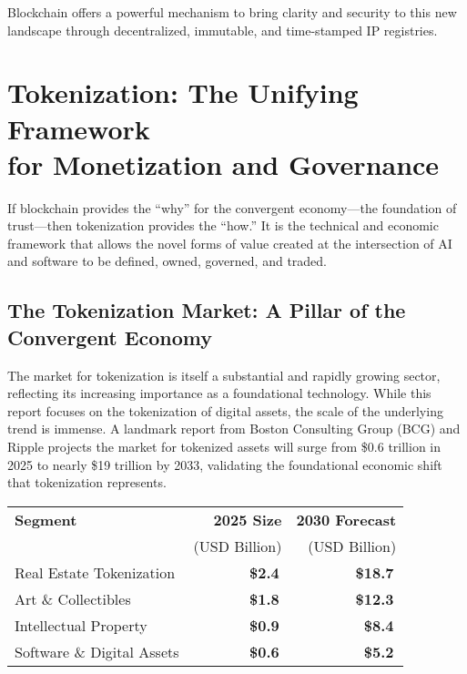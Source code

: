 \documentclass[11pt,a4paper]{report}
\newcommand{\marketvalue}[2]{\textcolor{trust}{\textbf{\$#1}}\,\textcolor{darkgray}{#2}}
\begin{document}
Blockchain offers a powerful mechanism to bring clarity and security to this new landscape through decentralized, immutable, and time-stamped IP registries.

\chapter{Tokenization: The Unifying Framework\\for Monetization and Governance}

If blockchain provides the ``why'' for the convergent economy---the foundation of trust---then tokenization provides the ``how.'' It is the technical and economic framework that allows the novel forms of value created at the intersection of AI and software to be defined, owned, governed, and traded.

\section{The Tokenization Market: A Pillar of the Convergent Economy}

The market for tokenization is itself a substantial and rapidly growing sector, reflecting its increasing importance as a foundational technology. While this report focuses on the tokenization of digital assets, the scale of the underlying trend is immense. A landmark report from Boston Consulting Group (BCG) and Ripple projects the market for tokenized assets will surge from \$0.6 trillion in 2025 to nearly \$19 trillion by 2033, validating the foundational economic shift that tokenization represents.

\begin{marketfigure}
\centering
\begin{tabular}{lrr}
\toprule
\textbf{Segment} & \textbf{2025 Size} & \textbf{2030 Forecast} \\
& (USD Billion) & (USD Billion) \\
\midrule
Real Estate Tokenization & \marketvalue{2.4}{} & \marketvalue{18.7}{} \\
Art \& Collectibles & \marketvalue{1.8}{} & \marketvalue{12.3}{} \\
Intellectual Property & \marketvalue{0.9}{} & \marketvalue{8.4}{} \\
Software \& Digital Assets & \marketvalue{0.6}{} & \marketvalue{5.2}{} \\
\bottomrule
\end{tabular}
\end{marketfigure}
\end{document}
